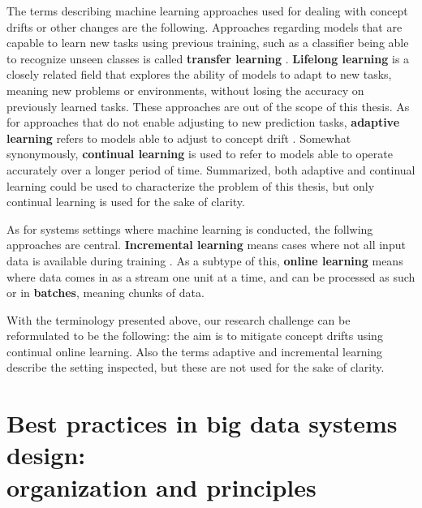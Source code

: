The terms describing machine learning approaches used for dealing with concept drifts or other changes are the following. Approaches regarding models that are capable to learn new tasks using previous training, such as a classifier being able to recognize unseen classes is called \textbf{transfer learning} \cite{iotsurvey}. \textbf{Lifelong learning} is a closely related field that explores the ability of models to adapt to new tasks, meaning new problems or environments, without losing the accuracy on previously learned tasks.  These approaches are out of the scope of this thesis. As for approaches that do not enable adjusting to new prediction tasks, \textbf{adaptive learning} refers to models able to adjust to concept drift \cite{conceptdriftsurvey}. Somewhat synonymously, \textbf{continual learning} is used to refer to models able to operate accurately over a longer period of time. Summarized, both adaptive and continual learning could be used to characterize the problem of this thesis, but only continual learning is used for the sake of clarity.

As for systems settings where machine learning is conducted, the follwing approaches are central. \textbf{Incremental learning} means cases where not all input data is available during training \cite{giraud-carrier_note_2000}. As a subtype of this, \textbf{online learning} means where data comes in as a stream one unit at a time, and can be processed as such or in \textbf{batches}, meaning chunks of data.


With the terminology presented above, our research challenge can be reformulated to be the following: the aim is to mitigate concept drifts using continual online learning. Also the terms adaptive and incremental learning describe the setting inspected, but these are not used for the sake of clarity.




\section[Best practices in big data systems design: organization and principles]{Best practices in big data systems design:\\ organization and principles}


